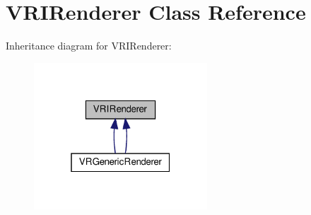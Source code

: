 \hypertarget{classVRIRenderer}{}\section{V\+R\+I\+Renderer Class Reference}
\label{classVRIRenderer}


Inheritance diagram for V\+R\+I\+Renderer\+:
\nopagebreak
\begin{figure}[H]
\begin{center}
\leavevmode
\includegraphics[width=184pt]{classVRIRenderer__inherit__graph}
\end{center}
\end{figure}
